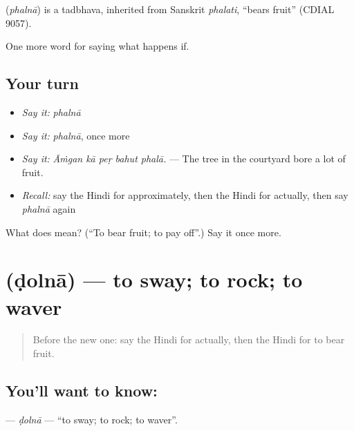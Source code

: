 \begin{cousinweb}
\textbf{} (\emph{phalnā}) is a tadbhava, inherited from Sanskrit \emph{phalati}, \textquotedblleft{}bears fruit\textquotedblright{} (CDIAL 9057).
\end{cousinweb}

\begin{grammarlens}[title={What you've built}]
One more word for saying what happens if.
\end{grammarlens}

\subsection*{Your turn}
\begin{itemize}
\raggedright
  \item \emph{Say it:} \emph{phalnā}
  \item \emph{Say it:} \emph{phalnā}, once more
  \item \emph{Say it:} \emph{Āṁgan kā peṛ bahut phalā.} — The tree in the courtyard bore a lot of fruit.
  \item \emph{Recall:} say the Hindi for approximately, then the Hindi for actually, then say \emph{phalnā} again
\end{itemize}

\begin{tcolorbox}[breakable,colback=teal!4,colframe=teal!35!black,title={Before you move on}]
What does  mean? (\textquotedblleft{}To bear fruit; to pay off\textquotedblright{}.) Say it once more.
\end{tcolorbox}
\section[\texorpdfstring{\hi{डोलना} (ḍolnā)}{डोलना (ḍolnā)}]{ (ḍolnā) — to sway; to rock; to waver}

\label{lesson:HI-C555-dolna}



\begin{quote}
Before the new one: say the Hindi for actually, then the Hindi for to bear fruit.
\end{quote}

\subsection*{You'll want to know: }
\textbf{} — \emph{ḍolnā} — \textquotedblleft{}to sway; to rock; to waver\textquotedblright{}.

